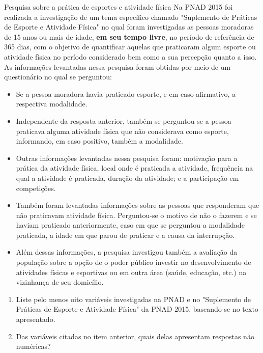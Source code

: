 \begin{task}{ Pesquisa sobre a prática de esportes e atividade física}
Na PNAD 2015 foi realizada a investigação de um tema específico chamado "Suplemento de Práticas de Esporte e Atividade Física" no qual foram investigadas as pessoas moradoras de 15 anos ou mais de idade, \textbf{em seu tempo livre}, no período de referência de 365 dias, com o objetivo de quantificar aquelas que praticaram algum esporte ou atividade física no período considerado bem como a sua percepção quanto a isso. As informações levantadas nessa pesquisa foram obtidas por meio de um questionário no qual se perguntou:
\begin{itemize}
\item {} 
Se a pessoa moradora havia praticado esporte, e em caso afirmativo, a respectiva modalidade.

\item {} 
Independente da resposta anterior, também se perguntou se a pessoa praticava alguma atividade física que não considerava como esporte, informando, em caso positivo, também a modalidade.

\item {} 
Outras informações levantadas nessa pesquisa foram: motivação para a prática da atividade física, local onde é praticada a atividade, frequência na qual a atividade é praticada, duração da atividade; e a participação em competições.

\item {} 
Também foram levantadas informações sobre as pessoas que responderam que não praticavam atividade física. Perguntou-se o motivo de não o fazerem e se haviam praticado anteriormente, caso em que se perguntou a modalidade praticada, a idade em que parou de praticar e a causa da interrupção.

\item {} 
Além dessas informações, a pesquisa investigou também a avaliação da população sobre a opção de o poder público investir no desenvolvimento de atividades físicas e esportivas ou em outra área (saúde, educação, etc.) na vizinhança de seu domicílio.

\end{itemize}
\begin{enumerate}
\item {} 
Liste pelo menos oito variáveis investigadas na PNAD e no "Suplemento de Práticas de Esporte e Atividade Física" da PNAD 2015, baseando-se no texto apresentado.

\item {} 
Das variáveis citadas no item anterior, quais delas apresentam respostas não numéricas?


\end{enumerate}
\end{task}
